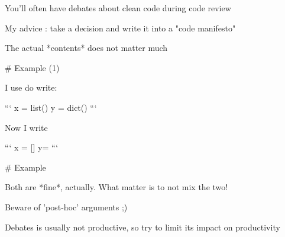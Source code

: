 You'll often have debates about clean code during code review

My advice : take a decision and write it into a "code manifesto"

The actual *contents* does not matter much

# Example (1)

I use do write:

```
x = list()
y = dict()
```

Now I write

```
x = []
y= {}
```

# Example

Both are *fine*, actually. What matter is to not mix the two!

Beware of 'post-hoc' arguments ;)

Debates is usually not productive, so try to limit its impact
on productivity
